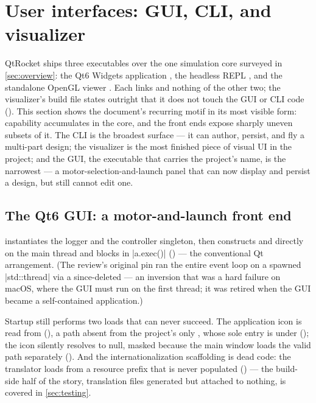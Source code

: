 \section{User interfaces: GUI, CLI, and visualizer}\label{sec:interfaces}

QtRocket ships three executables over the one simulation core surveyed in \cref{sec:overview}: the
Qt6 Widgets application , the headless REPL , and the standalone
OpenGL viewer . Each links  and nothing of the other
two; the visualizer's build file states outright that it does not touch the GUI or CLI code
(). This section shows the document's recurring motif in its most
visible form: capability accumulates in the core, and the front ends expose sharply uneven subsets
of it. The CLI is the broadest surface --- it can author, persist, and fly a multi-part design; the
visualizer is the most finished piece of visual UI in the project; and the GUI, the executable that
carries the project's name, is the narrowest --- a motor-selection-and-launch panel that can now
display and persist a design, but still cannot edit one.

\subsection{The Qt6 GUI: a motor-and-launch front end}\label{sec:interfaces-gui}

 instantiates the logger and the  controller singleton, then
constructs  and  directly on the main thread and blocks in
\cppinline|a.exec()| () --- the conventional Qt arrangement. (The review's
original pin ran the entire event loop on a spawned \cppinline|std::thread| via a since-deleted
 --- an inversion that was a hard failure on macOS, where the GUI must run on the
first thread; it was retired when the GUI became a self-contained application.)

Startup still performs two loads that can never succeed. The application icon is read from
 (), a path absent from the project's only
, whose sole entry is  under 
(); the icon silently resolves to null, masked because the main window loads
the valid path separately (). And the internationalization scaffolding
is dead code: the translator loads  from a  resource prefix
that is never populated () --- the build-side half of the story, translation files
generated but attached to nothing, is covered in \cref{sec:testing}.

